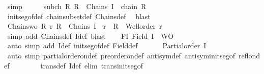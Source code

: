 \begin{isabellebody}
\ simp\isanewline
\ \ \isamarkupfalse%
\ \isamarkupfalse%
\ subch{\isacharcolon}{\kern0pt}\ {\isachardoublequoteopen}{\isasymAnd}R{\isachardot}{\kern0pt}\ R\ {\isasymin}\ Chains\ I\ {\isasymLongrightarrow}\ chain\isactrlsub {\isasymsubseteq}\ R{\isachardoublequoteclose}\isanewline
\ \ \ \ \isamarkupfalse%
\ init{\isacharunderscore}{\kern0pt}seg{\isacharunderscore}{\kern0pt}of{\isacharunderscore}{\kern0pt}def\ chain{\isacharunderscore}{\kern0pt}subset{\isacharunderscore}{\kern0pt}def\ Chains{\isacharunderscore}{\kern0pt}def\ \isamarkupfalse%
\ blast\isanewline
\ \ \isamarkupfalse%
\ Chains{\isacharunderscore}{\kern0pt}wo{\isacharcolon}{\kern0pt}\ {\isachardoublequoteopen}{\isasymAnd}R\ r{\isachardot}{\kern0pt}\ R\ {\isasymin}\ Chains\ I\ {\isasymLongrightarrow}\ r\ {\isasymin}\ R\ {\isasymLongrightarrow}\ Well{\isacharunderscore}{\kern0pt}order\ r{\isachardoublequoteclose}\isanewline
\ \ \ \ \isamarkupfalse%
\ {\isacharparenleft}{\kern0pt}simp\ add{\isacharcolon}{\kern0pt}\ Chains{\isacharunderscore}{\kern0pt}def\ I{\isacharunderscore}{\kern0pt}def{\isacharparenright}{\kern0pt}\ blast\isanewline
\ \ \isamarkupfalse%
\ FI{\isacharcolon}{\kern0pt}\ {\isachardoublequoteopen}Field\ I\ {\isacharequal}{\kern0pt}\ {\isacharquery}{\kern0pt}WO{\isachardoublequoteclose}\isanewline
\ \ \ \ \isamarkupfalse%
\ {\isacharparenleft}{\kern0pt}auto\ simp\ add{\isacharcolon}{\kern0pt}\ I{\isacharunderscore}{\kern0pt}def\ init{\isacharunderscore}{\kern0pt}seg{\isacharunderscore}{\kern0pt}of{\isacharunderscore}{\kern0pt}def\ Field{\isacharunderscore}{\kern0pt}def{\isacharparenright}{\kern0pt}\isanewline
\ \ \isamarkupfalse%
\ \isamarkupfalse%
\ {}{\isacharcolon}{\kern0pt}\ {\isachardoublequoteopen}Partial{\isacharunderscore}{\kern0pt}order\ I{\isachardoublequoteclose}\isanewline
\ \ \ \ \isamarkupfalse%
\ {\isacharparenleft}{\kern0pt}auto\ simp{\isacharcolon}{\kern0pt}\ partial{\isacharunderscore}{\kern0pt}order{\isacharunderscore}{\kern0pt}on{\isacharunderscore}{\kern0pt}def\ preorder{\isacharunderscore}{\kern0pt}on{\isacharunderscore}{\kern0pt}def\ antisym{\isacharunderscore}{\kern0pt}def\ antisym{\isacharunderscore}{\kern0pt}init{\isacharunderscore}{\kern0pt}seg{\isacharunderscore}{\kern0pt}of\ refl{\isacharunderscore}{\kern0pt}on{\isacharunderscore}{\kern0pt}def\isanewline
\ \ \ \ \ \ \ \ trans{\isacharunderscore}{\kern0pt}def\ I{\isacharunderscore}{\kern0pt}def\ elim{\isacharbang}{\kern0pt}{\isacharcolon}{\kern0pt}\ trans{\isacharunderscore}{\kern0pt}init{\isacharunderscore}{\kern0pt}seg{\isacharunderscore}{\kern0pt}of{\isacharparenright}{\kern0pt}\isanewline

\end{isabellebody}

